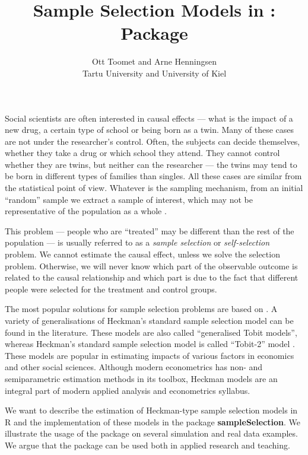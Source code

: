 \documentclass[12pt]{scrartcl}
\author{Ott Toomet and Arne Henningsen\\
  \normalsize Tartu University and University of Kiel}
\title{Sample Selection Models in \proglang{R}:\\
  Package \pkg{sampleSelection}}
\newcommand{\pkg}[1]{\mbox{\textbf{#1}}}
\newcommand{\proglang}[1]{\mbox{\textsf{#1}}}
\begin{document}
\maketitle

Social scientists are often interested in causal effects --- what is
the impact of a new drug, a certain type of school or being born as a
twin.  Many of these cases are not under the researcher's control.  
Often, the subjects can decide themselves, whether they take a
drug or which school they attend.  They cannot control whether they
are twins, but neither can the researcher --- the twins may tend to be
born in different types of families than singles.  All these cases
are similar from the statistical point of view.  Whatever is the
sampling mechanism, from an initial ``random'' sample we extract a
sample of interest, which may not be representative of the population
as a whole
\citep[see][p.~1937, for a discussion]{heckman+macurdy1986}.

This problem --- people who are ``treated'' may be different than the rest
of the population --- is usually referred to as a \emph{sample
  selection} or \emph{self-selection} problem.  We cannot estimate the
causal effect, unless we solve the selection
problem.
Otherwise, we will
never know which part of the observable outcome is related to the
causal relationship and which part is due to the fact that different
people were selected for the treatment and control groups.

The most popular solutions for sample selection problems
are based on \citet{heckman1976}.
A variety of generalisations of Heckman's standard sample selection model
can be found in the literature.
These models are also called ``generalised Tobit models'',
whereas Heckman's standard sample selection model
is called ``Tobit-2'' model \citep{amemiya84,amemiya1985}.
These models are popular in estimating impacts
of various factors in economics and other social sciences.
Although modern econometrics has non- and semiparametric estimation
methods in its toolbox, Heckman models are an integral part of
modern applied analysis and econometrics syllabus.

We want to describe the estimation of Heckman-type sample
selection models in \proglang{R}
and the implementation of these models
in the package \pkg{sampleSelection}.
We illustrate the usage of the package on several simulation
and real data examples.
We argue that the package can be used both in applied research and
teaching.


\end{document}

